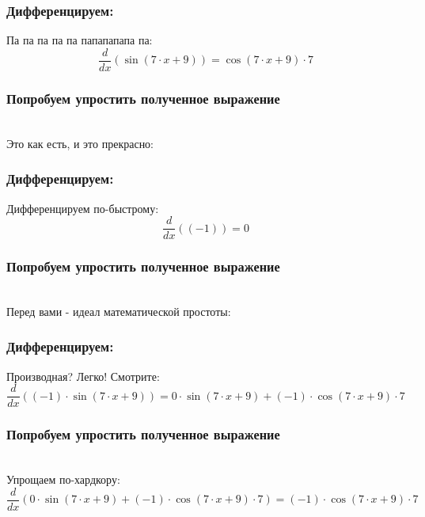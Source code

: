 \documentclass[a4paper,12pt]{article}
\begin{document}
\subsubsection*{Дифференцируем:}

Па па па па па папапапапа па:
\begin{dmath}\frac{d}{dx}\left(\operatorname{sin}\left(7\cdot x+ 9\right) \right)=\operatorname{cos}\left(7\cdot x+ 9\right) \cdot 7\end{dmath}
\subsubsection*{Попробуем упростить полученное выражение}
\\Это как есть, и это прекрасно:

\subsubsection*{Дифференцируем:}

Дифференцируем по-быстрому:
\begin{dmath}\frac{d}{dx}\left((-1)\right)=0\end{dmath}
\subsubsection*{Попробуем упростить полученное выражение}
\\Перед вами - идеал математической простоты:

\subsubsection*{Дифференцируем:}

Производная? Легко! Смотрите:
\begin{dmath}\frac{d}{dx}\left((-1)\cdot \operatorname{sin}\left(7\cdot x+ 9\right) \right)=0\cdot \operatorname{sin}\left(7\cdot x+ 9\right) + (-1)\cdot \operatorname{cos}\left(7\cdot x+ 9\right) \cdot 7\end{dmath}
\subsubsection*{Попробуем упростить полученное выражение}
\\Упрощаем по-хардкору:\\
\begin{dmath}
	\frac{d}{dx}\left(0\cdot \operatorname{sin}\left(7\cdot x+ 9\right) + (-1)\cdot \operatorname{cos}\left(7\cdot x+ 9\right) \cdot 7\right) = (-1)\cdot \operatorname{cos}\left(7\cdot x+ 9\right) \cdot 7\end{dmath}
\end{document}

